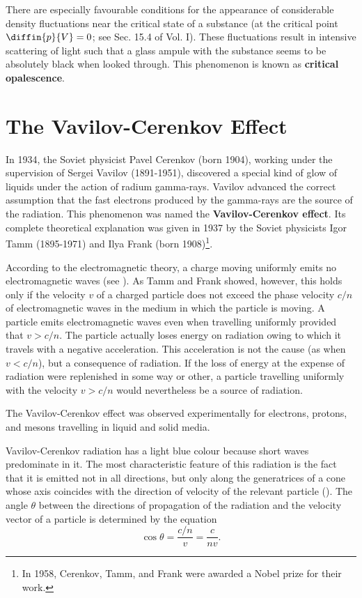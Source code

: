 There are especially favourable conditions for  the appearance of considerable density fluctuations near the critical state of a substance (at the critical point $\diffin{p}{V}= 0$; see Sec. 15.4 of Vol. I).
These fluctuations result in intensive scattering of light such that a glass ampule with the substance seems to be absolutely black when looked through.
This phenomenon is known as \textbf{critical opalescence}.

\section{The Vavilov-Cerenkov Effect}\label{sec:20_6}

In 1934, the Soviet physicist Pavel Cerenkov (born 1904), working under the supervision of Sergei Vavilov (1891-1951), discovered a special kind of glow of liquids under the action of radium gamma-rays.
Vavilov advanced the correct assumption that the fast electrons produced by the gamma-rays are the source of the radiation.
This phenomenon was named the \textbf{Vavilov-Cerenkov effect}.
Its complete theoretical explanation was given in 1937 by the Soviet physicists Igor Tamm (1895-1971) and Ilya Frank (born 1908)\footnote{In 1958, Cerenkov, Tamm, and Frank were awarded a Nobel prize for their work.}.

According to the electromagnetic theory, a charge moving uniformly emits no electromagnetic waves (see ).
As Tamm and Frank showed, however, this holds only if the velocity $v$ of a charged particle does not exceed the phase velocity $c/n$ of electromagnetic waves in the medium in which the particle is moving.
A particle emits electromagnetic waves even when travelling uniformly provided that $v>c/n$.
The particle actually loses energy on radiation owing to which it travels with a negative acceleration.
This acceleration is not the cause (as when $v<c/n$), but a consequence of radiation.
If the loss of energy at the expense of radiation were replenished in some way or other, a particle travelling uniformly with the velocity $v>c/n$ would nevertheless be a source of radiation.

The Vavilov-Cerenkov effect was observed experimentally for electrons, protons, and mesons travelling in liquid and solid media.

Vavilov-Cerenkov radiation has a light blue colour because short waves predominate in it.
The most characteristic feature of this radiation is the fact that it is emitted not in all directions, but only along the generatrices of a cone whose axis coincides with the direction
of velocity of the relevant particle ().
The angle $\theta$ between the directions of propagation of the radiation and the velocity vector of a particle is determined by the equation
\begin{equation}\label{eq:20_27}
	\cos\theta = \frac{c/n}{v} = \frac{c}{nv}.
\end{equation}

